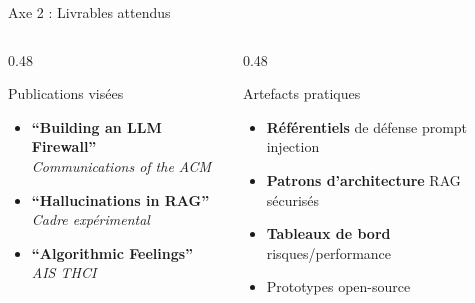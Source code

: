 \documentclass[aspectratio=169,11pt]{beamer}
\begin{document}
\begin{frame}{Axe 2 : Livrables attendus}
  \begin{columns}[T]
    \begin{column}{0.48\textwidth}
      \begin{block}{Publications visées}
        \begin{itemize}\small
          \item \textbf{``Building an LLM Firewall''}\\
          {\footnotesize\textit{Communications of the ACM}}
          \item \textbf{``Hallucinations in RAG''}\\
          {\footnotesize\textit{Cadre expérimental}}
          \item \textbf{``Algorithmic Feelings''}\\
          {\footnotesize\textit{AIS THCI}}
        \end{itemize}
      \end{block}
    \end{column}
    \begin{column}{0.48\textwidth}
      \begin{block}{Artefacts pratiques}
        \begin{itemize}\small
          \item \textbf{Référentiels} de défense prompt injection
          \item \textbf{Patrons d'architecture} RAG sécurisés
          \item \textbf{Tableaux de bord} risques/performance
          \item Prototypes open-source
        \end{itemize}
      \end{block}
    \end{column}
  \end{columns}
  
  \vspace{0.5em}
  
  \begin{center}
  \end{center}
\end{frame}
\end{document}

